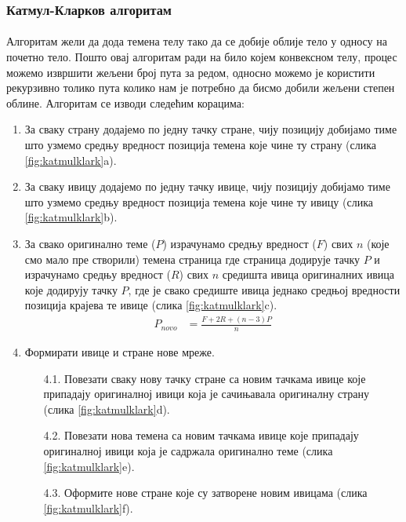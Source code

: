 \documentclass[12pt]{article}
\begin{document}
	\subsubsection{Катмул-Кларков алгоритам}\label{katmulklark}
	\paragraph{}
	Алгоритам жели да дода темена телу тако да се добије облије тело у односу на почетно тело. Пошто овај алгоритам ради на било којем конвексном телу, процес можемо извршити жељени број пута за редом, односно можемо је користити рекурзивно толико пута колико нам је потребно да бисмо добили жељени степен облине.  Алгоритам се изводи следећим корацима:
	\begin{enumerate}
		\item За сваку страну додајемо по једну тачку стране, чију позицију добијамо тиме што узмемо средњу вредност позиција темена које чине ту страну (слика \ref{fig:katmulklark}a).
		\item За сваку ивицу додајемо по једну тачку ивице, чију позицију добијамо тиме што узмемо средњу вредност позиција темена које чине ту ивицу (слика \ref{fig:katmulklark}b).
		\item За свако оригинално теме ($P$) израчунамо средњу вредност ($F$) свих $n$ (које смо мало пре створили) темена страница где страница додирује тачку $P$ и израчунамо средњу вредност ($R$) свих $n$ средишта ивица оригиналних ивица које додирују тачку $P$, где је свако средиште ивица једнако средњој вредности позиција крајева те ивице (слика \ref{fig:katmulklark}c).
		\begin{align}
			P_{novo}&=\frac{F+2R+(n-3)P}{n}
		\end{align}
		
		\item Формирати ивице и стране нове мреже.
		\begin{enumerate}
			\item[4.1.] Повезати сваку нову тачку стране са новим тачкама ивице које припадају оригиналној ивици која је сачињавала оригиналну страну (слика \ref{fig:katmulklark}d).
			\item[4.2.] Повезати нова темена са новим тачкама ивице које припадају оригиналној ивици која је садржала оригинално теме (слика \ref{fig:katmulklark}e).
			\item[4.3.] Оформите нове стране које су затворене новим ивицама (слика \ref{fig:katmulklark}f).
		\end{enumerate}
	\end{enumerate}
\end{document}
